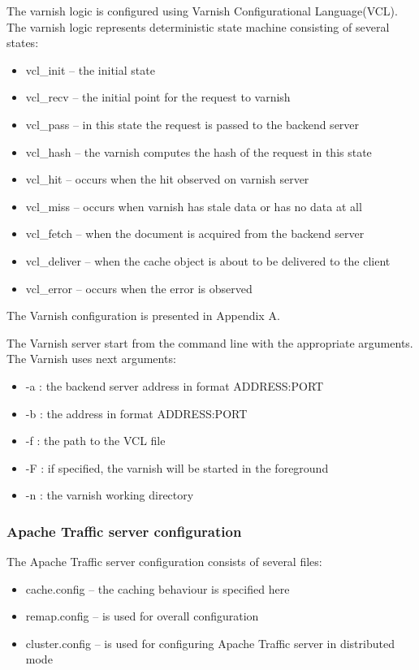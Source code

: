 The varnish logic is configured using Varnish Configurational Language(VCL). The varnish logic represents deterministic state machine consisting of several states:

\begin{itemize}
	\item vcl\_init -- the initial state 
	\item vcl\_recv -- the initial point for the request to varnish
	\item vcl\_pass -- in this state the request is passed to the backend server
	\item vcl\_hash -- the varnish computes the hash of the request in this state
	\item vcl\_hit -- occurs when the hit observed on varnish server
	\item vcl\_miss -- occurs when varnish has stale data or has no data at all
	\item vcl\_fetch -- when the document is acquired from the backend server
	\item vcl\_deliver -- when the cache object is about to be delivered to the client
	\item vcl\_error -- occurs when the error is observed
\end{itemize}

The Varnish configuration is presented in Appendix A.

The Varnish server start from the command line with the appropriate arguments. The Varnish uses next arguments:

\begin{itemize}
	\item -a : the backend server address in format ADDRESS:PORT
	\item -b : the  address in format ADDRESS:PORT
	\item -f : the path to the VCL file 
	\item -F : if specified, the varnish will be started in the foreground
	\item -n : the varnish working directory
\end{itemize} 

\subsubsection{Apache Traffic server configuration}

The Apache Traffic server configuration consists of several files: 

\begin{itemize}
	\item cache.config -- the caching behaviour is specified here
	\item remap.config  -- is used for overall configuration
	\item cluster.config -- is used for configuring Apache Traffic server in distributed mode
\end{itemize}

